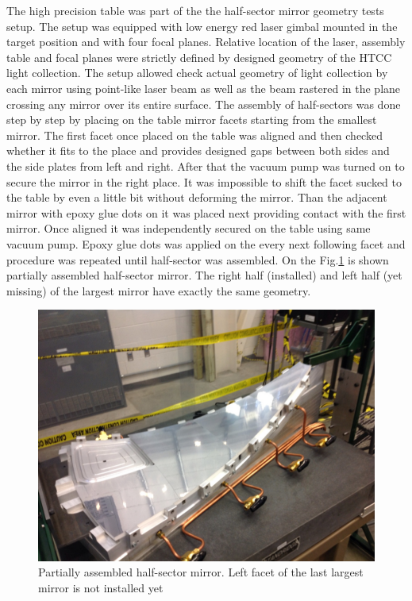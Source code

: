 The high precision table was part of the the half-sector mirror geometry tests setup. The setup was equipped with low energy red laser gimbal mounted in the target position and with four focal planes. Relative location of the laser, assembly table and focal planes were strictly defined by designed geometry of the HTCC light collection. The setup allowed check actual geometry of light collection by each mirror using point-like laser beam as well as the beam rastered in the plane crossing any mirror over its entire surface. The assembly of half-sectors was done step by step by placing on the table mirror facets starting from the smallest mirror. The first facet once placed on the table was aligned and then checked whether it fits to the place and provides designed gaps between both sides and the side plates from left and right. After that the vacuum pump was turned on to secure the mirror in the right place. It was impossible to shift the facet sucked to the table by even a little bit without deforming the mirror. Than the adjacent mirror with epoxy glue dots on it was placed next providing contact with the first mirror. Once aligned it was independently secured on the table using same vacuum pump. Epoxy glue dots was applied on the every next following facet and procedure was repeated until half-sector was assembled. 
On the Fig.\ref{fig:Partial_Half-sector} is shown partially assembled half-sector mirror. The right half (installed) and left half (yet missing) of the largest mirror have exactly the same geometry. 
\begin{figure}[!h]
    \centering
    \includegraphics[width=1.0\linewidth]{Partial_Half-sector.png}
    \caption{Partially assembled half-sector mirror. Left facet of the last largest mirror is not installed yet}
    \label{fig:Partial_Half-sector}
\end{figure}{}   
